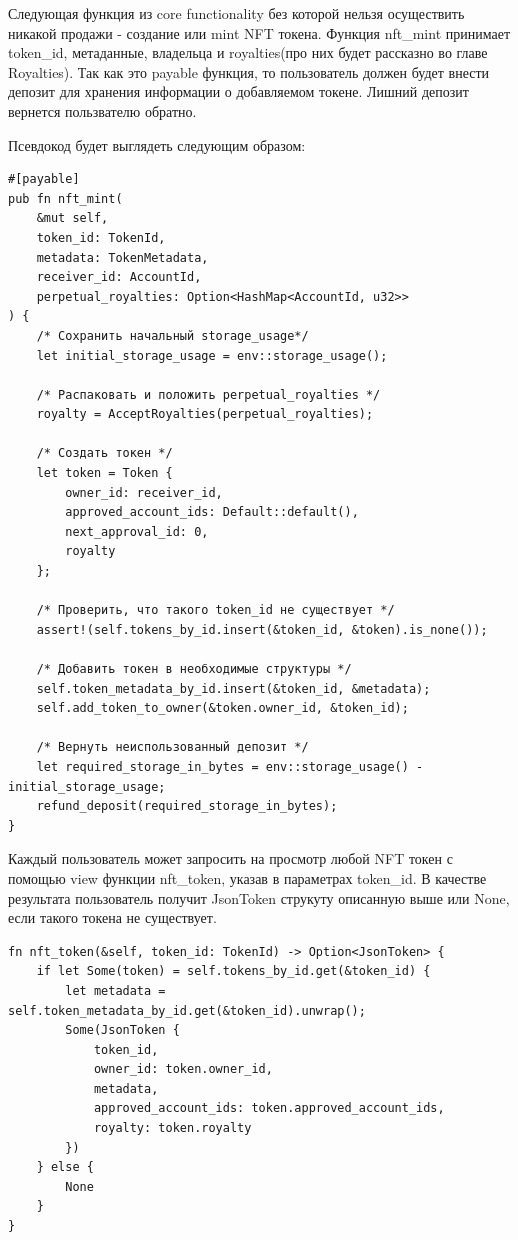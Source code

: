 Следующая функция из core functionality без которой нельзя осуществить никакой продажи - создание или mint NFT токена. Функция nft\_mint принимает token\_id, метаданные, владельца и royalties(про них будет рассказно во главе Royalties).
Так как это payable функция, то пользователь должен будет внести депозит для хранения информации о добавляемом токене. Лишний депозит вернется пользвателю обратно.

Псевдокод будет выглядеть следующим образом:

\begin{verbatim}
#[payable]
pub fn nft_mint(
    &mut self,
    token_id: TokenId,
    metadata: TokenMetadata,
    receiver_id: AccountId,
    perpetual_royalties: Option<HashMap<AccountId, u32>>
) {
    /* Сохранить начальный storage_usage*/
    let initial_storage_usage = env::storage_usage();

    /* Распаковать и положить perpetual_royalties */
    royalty = AcceptRoyalties(perpetual_royalties);

    /* Создать токен */
    let token = Token {
        owner_id: receiver_id,
        approved_account_ids: Default::default(),
        next_approval_id: 0,
        royalty
    };

    /* Проверить, что такого token_id не существует */
    assert!(self.tokens_by_id.insert(&token_id, &token).is_none());

    /* Добавить токен в необходимые структуры */
    self.token_metadata_by_id.insert(&token_id, &metadata);
    self.add_token_to_owner(&token.owner_id, &token_id);

    /* Вернуть неиспользованный депозит */
    let required_storage_in_bytes = env::storage_usage() - initial_storage_usage;
    refund_deposit(required_storage_in_bytes);
}
\end{verbatim}

Каждый пользователь может запросить на просмотр любой NFT токен с помощью view функции nft\_token, указав в параметрах token\_id.
В качестве результата пользователь получит JsonToken струкуту описанную выше или None, если такого токена не существует.

\begin{verbatim}
fn nft_token(&self, token_id: TokenId) -> Option<JsonToken> {
    if let Some(token) = self.tokens_by_id.get(&token_id) {
        let metadata = self.token_metadata_by_id.get(&token_id).unwrap();
        Some(JsonToken {
            token_id,
            owner_id: token.owner_id,
            metadata,
            approved_account_ids: token.approved_account_ids,
            royalty: token.royalty
        })
    } else {
        None
    }
}
\end{verbatim}

